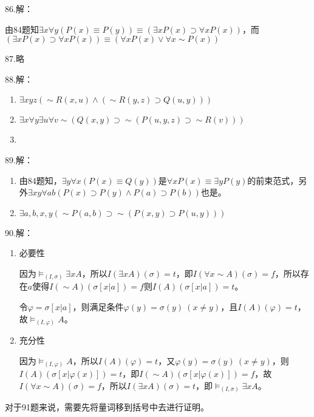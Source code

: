 \documentclass[a4paper]{ctexart}
\begin{document}
\noindent 86.解：

由84题知$\exists{x}\forall{y}(P(x)\equiv P(y))\equiv(\exists{x}P(x)\supset\forall{x}P(x))$，而$(\exists{x}P(x)\supset\forall{x}P(x))\equiv(\forall{x}P(x)\vee\forall{x}\sim P(x))$

\noindent 87.略

\noindent 88.解：
\begin{enumerate}
  \item $\exists{xyz}(\sim R(x,u)\wedge(\sim R(y,z)\supset Q(u,y)))$
  \item $\exists{x}\forall{y}\exists{u}\forall{v}\sim(Q(x,y)\supset\sim(P(u,y,z)\supset\sim R(v)))$\item 
\end{enumerate}

\noindent 89.解：
\begin{enumerate}
  \item 由84题知，$\exists{y}\forall{x}(P(x)\equiv Q(y))$是$\forall{x}P(x)\equiv\exists{y}P(y)$的前束范式，另外$\exists{xy}\forall{ab}(P(x)\supset P(y)\wedge P(a)\supset P(b))$也是。
  \item $\exists{a,b,x,y}(\sim P(a,b)\supset\sim(P(x,y)\supset P(u,y)))$
\end{enumerate}

\noindent 90.解：
\begin{enumerate}
  \item 必要性
  
  因为$\models_{(I,\sigma)}\exists{x}A$，所以$I(\exists{x}A)(\sigma)=t$，即$I(\forall{x}\sim A)(\sigma)=f$，所以存在$a$使得$I(\sim A)(\sigma[x|a])=f$则$I(A)(\sigma[x|a])=t$。

  令$\varphi=\sigma[x|a]$，则满足条件$\varphi(y)=\sigma(y)\ (x\neq y)$，且$I(A)(\varphi)=t$，故$\models_{(I,\varphi)}A$。
  \item 充分性
  
  因为$\models_{(I,\varphi)}A$，所以$I(A)(\varphi)=t$，又$\varphi(y)=\sigma(y)\ (x\neq y)$，则$I(A)(\sigma[x|\varphi(x)])=t$，即$I(\sim A)(\sigma[x|\varphi(x)])=f$，故$I(\forall{x}\sim A)(\sigma)=f$，所以$I(\exists{x}A)(\sigma)=t$，即$\models_{(I,\sigma)}\exists{x}A$。
\end{enumerate}

对于91题来说，需要先将量词移到括号中去进行证明。
\end{document}
